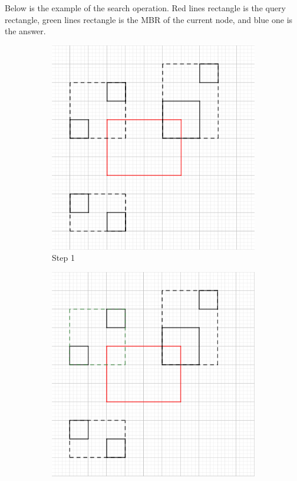 \documentclass{article}
\begin{document}
\par 
Below is the example of the search operation. Red lines rectangle is the query rectangle, green lines rectangle is the MBR of the current node, and blue one is the answer.\\
\begin{figure}[h]
\centering
    \begin{subfigure}{0.3\textwidth}
    \includegraphics[width=\textwidth]{search/1.png}
    \caption{Step 1}
    \centering
    \end{subfigure}
    \begin{subfigure}{0.3\textwidth}
    \includegraphics[width=\textwidth]{search/2.png}

\end{subfigure}
\end{figure}
\end{document}
